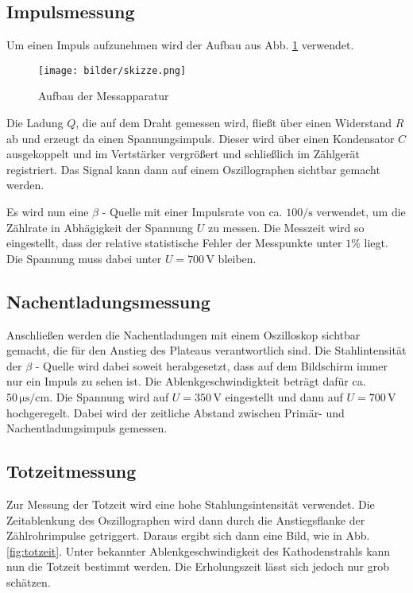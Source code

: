 \subsection{Impulsmessung}
Um einen Impuls aufzunehmen wird der Aufbau aus Abb. \ref{fig:skizze} verwendet.
\begin{figure}
  \centering
  \texttt{[image: bilder/skizze.png]}
  \caption{Aufbau der Messapparatur \cite{703}}
  \label{fig:skizze}
\end{figure}
Die Ladung $Q$, die auf dem Draht gemessen wird, fließt über einen Widerstand $R$
ab und erzeugt da einen Spannungsimpuls. Dieser wird über einen Kondensator $C$
ausgekoppelt und im Vertstärker vergrößert und schließlich im Zählgerät registriert.
Das Signal kann dann auf einem Oszillographen sichtbar gemacht werden.

Es wird nun eine $\beta$ - Quelle mit einer Impulsrate von ca. $100/\si{\second}$
verwendet, um die Zählrate in Abhägigkeit der Spannung $U$ zu messen. Die Messzeit
wird so eingestellt, dass der relative statistische Fehler
der Messpunkte unter $1 \%$ liegt. Die Spannung muss dabei unter $U  = 700 \,\si{\volt}$
bleiben.

\subsection{Nachentladungsmessung}
Anschließen werden die Nachentladungen mit einem Oszilloskop sichtbar gemacht, die
für den Anstieg des Plateaus verantwortlich sind. Die Stahlintensität der $\beta$ - Quelle
wird dabei soweit herabgesetzt, dass auf dem Bildschirm immer nur ein Impuls zu sehen ist.
Die Ablenkgeschwindigkteit beträgt dafür ca. $50 \,\si{\micro\second\per\centi\meter}$.
Die Spannung wird auf $U = 350\,\si{\volt}$ eingestellt und dann auf $U = 700\,\si{\volt}$
hochgeregelt. Dabei wird der zeitliche Abstand zwischen Primär- und Nachentladungsimpuls
gemessen.

\subsection{Totzeitmessung}
Zur Messung der Totzeit wird eine hohe Stahlungsintensität verwendet. Die Zeitablenkung
des Oszillographen wird dann durch die Anstiegsflanke der Zählrohrimpulse getriggert.
Daraus ergibt sich dann eine Bild, wie in Abb. \ref{fig:totzeit}. Unter bekannter
Ablenkgeschwindigkeit des Kathodenstrahls kann nun die Totzeit bestimmt werden.
Die Erholungszeit lässt sich jedoch nur grob schätzen.

